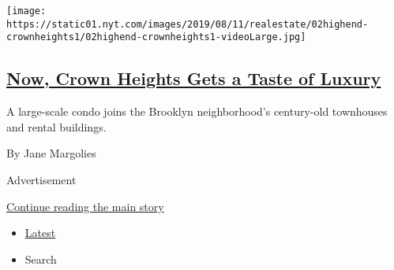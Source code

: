 \begin{enumerate}
  \texttt{[image: https://static01.nyt.com/images/2019/08/11/realestate/02highend-crownheights1/02highend-crownheights1-videoLarge.jpg]}

  \hypertarget{now-crown-heights-gets-a-taste-of-luxury}{%
  \subsection{\texorpdfstring{\href{/2019/08/09/realestate/now-crown-heights-gets-a-taste-of-luxury.html}{Now,
  Crown Heights Gets a Taste of
  Luxury}}{Now, Crown Heights Gets a Taste of Luxury}}\label{now-crown-heights-gets-a-taste-of-luxury}}

  A large-scale condo joins the Brooklyn neighborhood's century-old
  townhouses and rental buildings.

  By Jane Margolies
\end{enumerate}

Advertisement

\protect\hyperlink{after-mid1}{Continue reading the main story}

\begin{itemize}
\tightlist
\item
  \protect\hyperlink{stream-panel}{Latest}
\item
  Search
\end{itemize}

